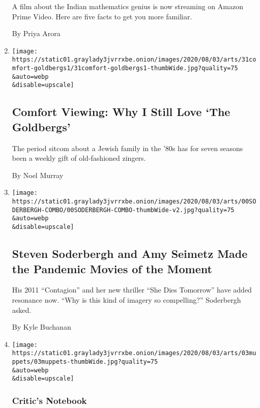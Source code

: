 \begin{enumerate}
  A film about the Indian mathematics genius is now streaming on Amazon
  Prime Video. Here are five facts to get you more familiar.

  By Priya Arora
\item
  \href{/2020/07/31/arts/television/goldbergs-abc-stream.html}{}

  \texttt{[image: https://static01.graylady3jvrrxbe.onion/images/2020/08/03/arts/31comfort-goldbergs1/31comfort-goldbergs1-thumbWide.jpg?quality=75\\\&auto=webp\\\&disable=upscale]}

  \hypertarget{comfort-viewing-why-i-still-love-the-goldbergs}{%
  \subsection{Comfort Viewing: Why I Still Love `The
  Goldbergs'}\label{comfort-viewing-why-i-still-love-the-goldbergs}}

  The period sitcom about a Jewish family in the '80s has for seven
  seasons been a weekly gift of old-fashioned zingers.

  By Noel Murray
\item
  \href{/2020/07/31/movies/steven-soderbergh-amy-seimetz-pandemic.html}{}

  \texttt{[image: https://static01.graylady3jvrrxbe.onion/images/2020/08/03/arts/00SODERBERGH-COMBO/00SODERBERGH-COMBO-thumbWide-v2.jpg?quality=75\\\&auto=webp\\\&disable=upscale]}

  \hypertarget{steven-soderbergh-and-amy-seimetz-made-the-pandemic-movies-of-the-moment}{%
  \subsection{Steven Soderbergh and Amy Seimetz Made the Pandemic Movies
  of the
  Moment}\label{steven-soderbergh-and-amy-seimetz-made-the-pandemic-movies-of-the-moment}}

  His 2011 ``Contagion'' and her new thriller ``She Dies Tomorrow'' have
  added resonance now. ``Why is this kind of imagery so compelling?''
  Soderbergh asked.

  By Kyle Buchanan
\item
  \href{/2020/07/31/arts/television/muppets-now.html}{}

  \texttt{[image: https://static01.graylady3jvrrxbe.onion/images/2020/08/03/arts/03muppets/03muppets-thumbWide.jpg?quality=75\\\&auto=webp\\\&disable=upscale]}

  \hypertarget{critics-notebook-3}{%
  \subsubsection{Critic's Notebook}\label{critics-notebook-3}}


\end{enumerate}
